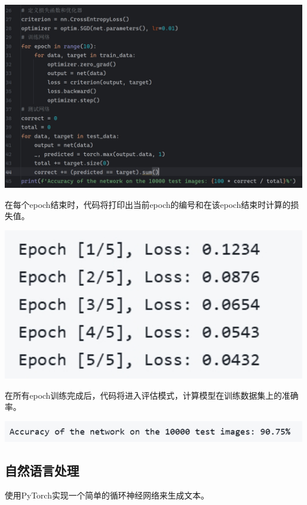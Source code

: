 \documentclass[UTF8,a4paper]{ctexart}
\begin{document}
\begin{sloppypar}
	\includegraphics[width = 14cm]{36}
	
	在每个epoch结束时，代码将打印出当前epoch的编号和在该epoch结束时计算的损失值。
	
	\includegraphics[width = 14cm]{36.1}
	
	在所有epoch训练完成后，代码将进入评估模式，计算模型在训练数据集上的准确率。
	
	\includegraphics[width = 14cm]{36.2}
	
	\subsection{自然语言处理}
	使用PyTorch实现一个简单的循环神经网络来生成文本。
	 

\end{sloppypar}
\end{document}
